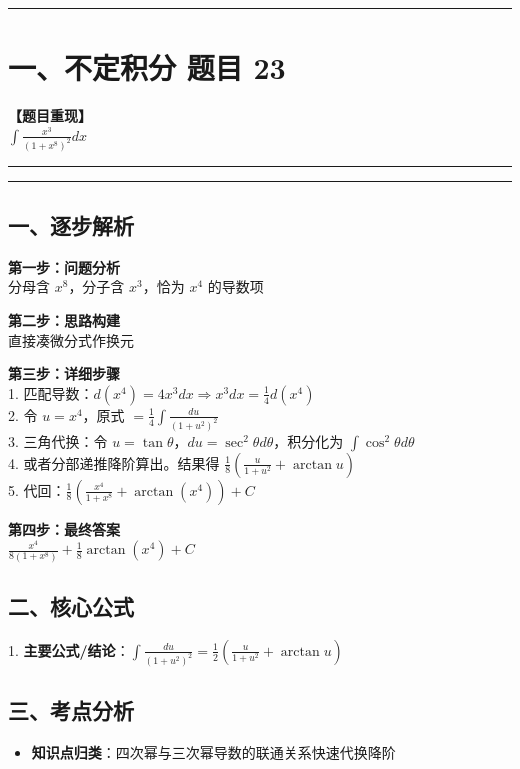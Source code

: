 ﻿\documentclass[12pt, a4paper]{ctexart}
\newcommand{\TopSeparator}{
    \par\noindent\rule{\textwidth}{1.5pt}\vspace{0.5em}
}
\newcommand{\AnalysisSeparator}{
    \par\noindent\rule{\textwidth}{0.5pt}\vspace{0.2em}\hrule\vspace{0.5em}
}
\newenvironment{RedAnalysis}{
    \par
    \color{red} 
}{
    \par
    \color{black} 
}
\begin{document}
\vspace{2em}

\TopSeparator
\section*{一、不定积分 题目 23}

\textbf{【题目重现】} \\
$\int \frac{x^3}{(1+x^8)^2} dx$

\AnalysisSeparator

\begin{RedAnalysis}

	\subsection*{一、逐步解析}

	\textbf{第一步：问题分析} \\
	分母含 $x^8$，分子含 $x^3$，恰为 $x^4$ 的导数项

	\textbf{第二步：思路构建} \\
	直接凑微分式作换元

	\textbf{第三步：详细步骤} \\
	1. 匹配导数：$d(x^4) = 4x^3 dx \Rightarrow x^3 dx = \frac{1}{4}d(x^4)$ \\ 
	2. 令 $u = x^4$，原式 $ = \frac{1}{4} \int \frac{du}{(1+u^2)^2}$ \\ 
	3. 三角代换：令 $u=\tan \theta$，$du=\sec^2\theta d\theta$，积分化为 $\int \cos^2\theta d\theta$ \\ 
	4. 或者分部递推降阶算出。结果得 $\frac{1}{8}(\frac{u}{1+u^2} + \arctan u)$ \\ 
	5. 代回：$\frac{1}{8} \left( \frac{x^4}{1+x^8} + \arctan(x^4) \right) + C$

	\textbf{第四步：最终答案} \\
	$\frac{x^4}{8(1+x^8)} + \frac{1}{8}\arctan(x^4) + C$

	\subsection*{二、核心公式}
	1. \textbf{主要公式/结论}：$\int \frac{du}{(1+u^2)^2} = \frac{1}{2}(\frac{u}{1+u^2} + \arctan u)$

	\subsection*{三、考点分析}
	\begin{itemize}
		\item \textbf{知识点归类}：四次幂与三次幂导数的联通关系快速代换降阶
	\end{itemize}

\end{RedAnalysis}
\end{document}
